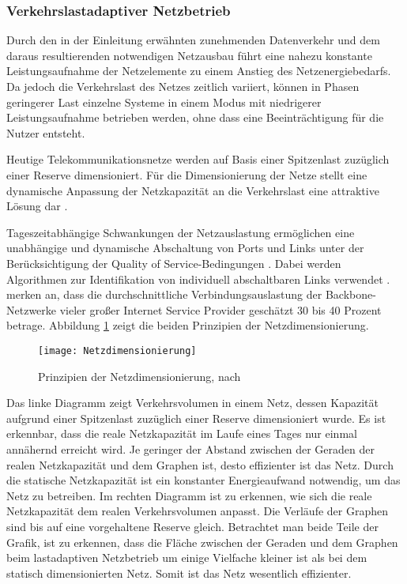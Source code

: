 \subsubsection{Verkehrslastadaptiver Netzbetrieb}
Durch den in der Einleitung erwähnten zunehmenden Datenverkehr und dem daraus resultierenden notwendigen Netzausbau führt eine nahezu konstante Leistungsaufnahme der Netzelemente zu einem Anstieg des Netzenergiebedarfs. Da jedoch die Verkehrslast des Netzes zeitlich variiert, können in Phasen geringerer Last einzelne Systeme in einem Modus mit niedrigerer Leistungsaufnahme betrieben werden, ohne dass eine Beeinträchtigung für die Nutzer entsteht.

Heutige Telekommunikationsnetze werden auf Basis einer Spitzenlast zuzüglich einer Reserve dimensioniert. Für die Dimensionierung der Netze stellt eine dynamische Anpassung der Netzkapazität an die Verkehrslast eine attraktive Lösung dar \cite{lange}.

Tageszeitabhängige Schwankungen der Netzauslastung ermöglichen eine unabhängige und dynamische Abschaltung von Ports und Links unter der Be\-rück\-sich\-ti\-gung der Quality of Service-Bedingungen \cite{aleksic2013}. Dabei werden Algorithmen zur Identifikation von individuell abschaltbaren Links verwendet \cite{fassnacht}. \textcite[1]{fisher} merken an, dass die durchschnittliche Verbindungsauslastung der Backbone-Netzwerke vieler großer Internet Service Provider geschätzt 30 bis 40 Prozent betrage. Abbildung \ref{fig:Netzdimensionierung} zeigt die beiden Prinzipien der Netzdimensionierung.

\begin{figure}[htb]
	\centering
	\texttt{[image: Netzdimensionierung]}
	\caption{Prinzipien der Netzdimensionierung, nach \cite{fisher}}
	\label{fig:Netzdimensionierung}
\end{figure}

Das linke Diagramm  zeigt Verkehrsvolumen in einem Netz, dessen Kapazität aufgrund einer Spitzenlast zuzüglich einer Reserve dimensioniert wurde. Es ist erkennbar, dass die reale Netzkapazität im Laufe eines Tages nur einmal annähernd erreicht wird. Je geringer der Abstand zwischen der Geraden der realen Netzkapazität und dem Graphen ist, desto effizienter ist das Netz. Durch die statische Netzkapazität ist ein konstanter Energieaufwand notwendig, um das Netz zu betreiben. 
Im rechten Diagramm  ist zu erkennen, wie sich die reale Netzkapazität dem realen Verkehrsvolumen anpasst. Die Verläufe der Graphen sind bis auf eine vorgehaltene Reserve gleich. Betrachtet man beide Teile der Grafik, ist zu erkennen, dass die Fläche zwischen der Geraden und dem Graphen beim lastadaptiven Netzbetrieb um einige Vielfache kleiner ist als bei dem statisch dimensionierten Netz. Somit ist das Netz wesentlich effizienter.


